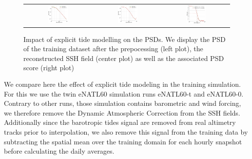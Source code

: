 \begin{bibunit}
\begin{figure}[H]
\begin{center}
\begin{tabular}{ccc}

\includegraphics[width=0.31\textwidth]{00_Simulearning/figures/plots2/isotrop_psd_tide_train.png} &
\includegraphics[width=0.31\textwidth]{00_Simulearning/figures/plots2/isotrop_psd_tide_rec.png} &
\includegraphics[width=0.31\textwidth]{00_Simulearning/figures/plots2/tide_1d_psd_score.png}


\end{tabular}
\vspace{-3mm}
\caption{
Impact of explicit tide modelling on the PSDs. We display the PSD of the training dataset after the prepocessing (left plot), the reconstructed SSH field (center plot) as well as the associated PSD score (right plot)}\vspace{-5mm}
\label{fig:tidepsd}
\end{center}
\end{figure}

We compare here the effect of explicit tide modeling in the training simulation. For this we use the twin eNATL60 simulation runs eNATL60-t and eNATL60-0.  Contrary to other runs, those simulation contains barometric and wind forcing, we therefore remove the Dynamic Atmospheric Correction from the SSH fields. Additionally since the barotropic tides signal are removed from real altimetry tracks prior to interpolation, we also remove this signal from the training data by subtracting the spatial mean over the training domain for each hourly snapshot before calculating the daily averages.  


\end{bibunit}
